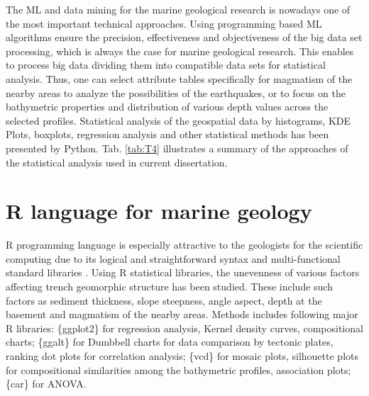 \documentclass[11pt,a4paper]{report}
\begin{document}
{The \ac{ML} and data mining for the marine geological research is nowadays one of the most important technical approaches. Using programming based \ac{ML} algorithms ensure the precision, effectiveness and objectiveness of the big data set processing, which is always the case for marine geological research. This enables to process big data dividing them into compatible data sets for statistical analysis. Thus, one can select attribute tables specifically for magmatism of the nearby areas to analyze the possibilities of the earthquakes, or to focus on the bathymetric properties and distribution of various depth values across the selected profiles. Statistical analysis of the geospatial data by histograms, \ac{KDE} Plots, boxplots, regression analysis and other statistical methods has been presented by Python. Tab. \ref{tab:T4} illustrates a summary of the approaches of the statistical analysis used in current dissertation.

\pagebreak
\section{R language for marine geology}\label{sec:R}
R programming language is especially attractive to the geologists for the scientific computing due to its logical and straightforward syntax and multi-functional standard libraries \cite{Lemenkova202030}. Using R statistical libraries, the unevenness of various factors affecting trench geomorphic structure has been studied. These include such factors as sediment thickness, slope steepness, angle aspect, depth at the basement and magmatism of the nearby areas. Methods includes following major R libraries: \{ggplot2\} for regression analysis, Kernel density curves, compositional charts; \{ggalt\} for Dumbbell charts for data comparison by tectonic plates, ranking dot plots for correlation analysis; \{vcd\} for mosaic plots, silhouette plots for compositional similarities among the bathymetric profiles, association plots; \{car\} for \ac{ANOVA}. 

}
\end{document}
